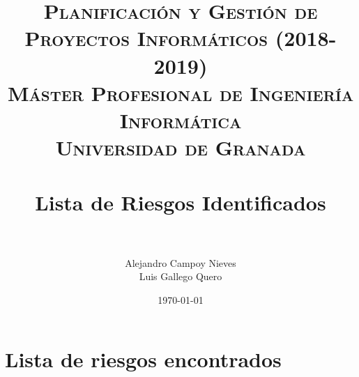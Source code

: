 

\title{	
	\normalfont \normalsize 
	\textsc{\textbf{Planificación y Gestión de Proyectos Informáticos (2018-2019)} \\ Máster Profesional de Ingeniería Informática \\ Universidad de Granada} \\ [25pt] %
	\horrule{0.5pt} \\[0.4cm] %
	\huge Lista de Riesgos Identificados \\ %
	\horrule{2pt} \\[0.5cm] %
}

\author{Alejandro Campoy Nieves \\ Luis Gallego Quero} %
\date{\normalsize\today} %

\usepackage[spanish, es-tabla]{babel}
\usepackage{hyperref} %
\hypersetup{
	colorlinks=true,
	linkcolor=blue,
	filecolor=magenta,      
	urlcolor=cyan,
}
\usepackage{graphicx}
\usepackage{amssymb, amsmath, amsbsy}
\usepackage{mathptmx}	
\usepackage{float}
\usepackage{booktabs}					%
\usepackage{eurosym}
\usepackage{xcolor}
\usepackage{colortbl}




	\maketitle %
	
	\newpage %
	
	\tableofcontents %
	
	
	
	\newpage	
 
 \section*{Lista de riesgos encontrados}
 
